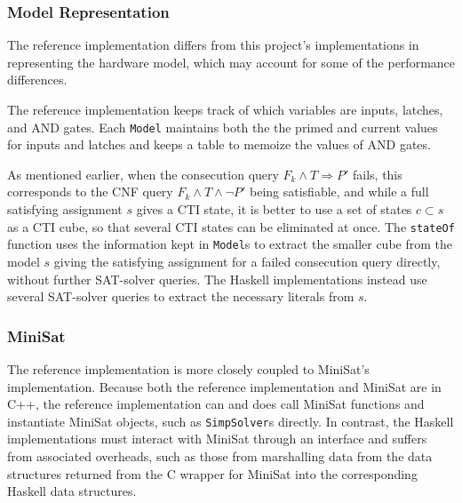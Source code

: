 \documentclass[12pt,a4paper,twoside,openright]{report}
\begin{document}
{\subsubsection{Model Representation}
The reference implementation differs from this project's implementations in representing the hardware model,
which may account for some of the performance differences.

The reference implementation keeps track of which variables are inputs, latches, and AND gates.
Each \verb,Model, maintains both the the primed and current values for inputs and latches and keeps a
table to memoize the values of AND gates.


As mentioned earlier, when the consecution query $F_k \wedge T \Rightarrow P'$ fails, this corresponds
to the CNF query $F_k \wedge T \wedge \neg P'$ being satisfiable, and while a full satisfying assignment
$s$ gives a CTI state, it is better to use a set of states $c \subset s$ as a CTI cube, so that several
CTI states can be eliminated at once.
The \verb,stateOf, function uses the information kept in \verb,Model,s to extract the smaller
cube from the model $s$ giving the satisfying assignment for a failed consecution query directly,
without further SAT-solver queries.
The Haskell implementations instead use several SAT-solver queries to extract the necessary literals
from $s$.

\subsubsection{MiniSat}
The reference implementation is more closely coupled to MiniSat's implementation. Because both the reference
implementation and MiniSat are in C++, the reference implementation can and does call MiniSat functions
and instantiate MiniSat objects, such as \verb,SimpSolver,s directly.
In contrast, the Haskell implementations
must interact with MiniSat through an interface and suffers from associated overheads, such as those from
marshalling data from the data structures returned from the C wrapper for MiniSat into the corresponding
Haskell data structures.

}
\end{document}
